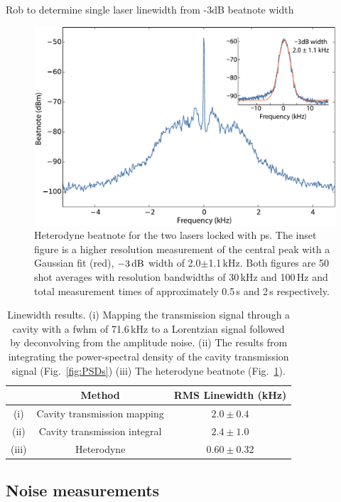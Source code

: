 {\color{red} Rob to determine single laser linewidth from -3dB beatnote width}

\begin{figure}[htbp]
\centering
\includegraphics[width=\linewidth]{chapter1/Figs/fig5_v1.pdf}
\caption{Heterodyne beatnote for the two lasers locked with \gls*{ps}.
The inset figure is a higher resolution measurement of the central peak with a Gaussian fit (red), $-3\rm\,dB$ width of 2.0$\pm$1.1\,kHz.
Both figures are 50 shot averages with resolution bandwidths of 30\,kHz and 100\,Hz and total measurement times of approximately 0.5\,s and 2\,s respectively.}
\label{beatnote}
\end{figure}

\begin{table}[htbp]
\centering
\begin{tabular}{c c c}
\hline
  & Method & RMS Linewidth (kHz) \\ \hline
  (i) & Cavity transmission mapping  & $2.0 \pm 0.4$ \\
  (ii) &Cavity transmission integral & $2.4 \pm 1.0$ \\
  (iii) & Heterodyne & $0.60\pm0.32$ \\ \hline\end{tabular}
\caption{Linewidth results.
(i) Mapping the transmission signal through a cavity with a \gls*{fwhm} of 71.6\,kHz to a Lorentzian signal followed by deconvolving from the amplitude noise.
(ii) The results from integrating the power-spectral density of the cavity transmission signal (Fig.~\ref{fig:PSDs}) (iii) The heterodyne beatnote (Fig.~\ref{beatnote}).}
\label{linewidth_table}
\end{table}

\subsection{Noise measurements}
